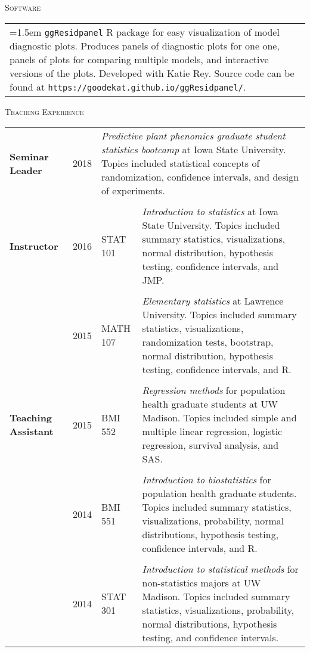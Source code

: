 \documentclass[10pt, oneside]{article}
\begin{document}
\noindent \textsc{Software} \hrulefill
\begin{longtable}{p{16.5cm}}
\hangindent=1.5em \texttt{ggResidpanel} R package for easy visualization of model diagnostic plots. Produces panels of diagnostic plots for one one, panels of plots for comparing multiple models, and interactive versions of the plots. Developed with Katie Rey. Source code can be found at \texttt{https://goodekat.github.io/ggResidpanel/}.
\end{longtable}

\noindent \textsc{Teaching Experience} \hrulefill

\begin{longtable}{p{2cm}p{1cm}p{2cm}p{11.5cm}}
\textbf{Seminar Leader} & \hfill{2018} & \multicolumn{2}{p{13.5cm}}{\emph{Predictive plant phenomics graduate student statistics bootcamp} at Iowa State University. Topics included statistical concepts of randomization, confidence intervals, and design of experiments.}\\
\\
\textbf{Instructor} & \hfill{2016} & STAT 101 & \emph{Introduction to statistics} at Iowa State University. Topics included summary statistics, visualizations, normal distribution, hypothesis testing, confidence intervals, and JMP.\\
\\
& \hfill{2015} & MATH 107 & \emph{Elementary statistics} at Lawrence University. Topics included summary statistics, visualizations, randomization tests, bootstrap, normal distribution, hypothesis testing, confidence intervals, and R.\\
\\
\textbf{Teaching Assistant} & \hfill{2015} & BMI 552 & \emph{Regression methods} for population health graduate students at UW Madison. Topics included simple and multiple linear regression, logistic regression, survival analysis, and SAS.\\
\\
& \hfill{2014} & BMI 551 & \emph{Introduction to biostatistics} for population health graduate students. Topics included summary statistics, visualizations, probability, normal distributions, hypothesis testing, confidence intervals, and R.\\
\\
& \hfill{2014} & STAT 301 & \emph{Introduction to statistical methods} for non-statistics majors at UW Madison. Topics included summary statistics, visualizations, probability, normal distributions, hypothesis testing, and confidence intervals.\\

\end{longtable}
\end{document}
